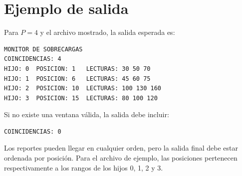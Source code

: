 \documentclass[12pt,a4paper]{article}
\begin{document}
\section*{Ejemplo de salida}
Para $P=4$ y el archivo mostrado, la salida esperada es:

\begin{lstlisting}[language={}, numbers=none]
MONITOR DE SOBRECARGAS
COINCIDENCIAS: 4
HIJO: 0  POSICION: 1   LECTURAS: 30 50 70
HIJO: 1  POSICION: 6   LECTURAS: 45 60 75
HIJO: 2  POSICION: 10  LECTURAS: 100 130 160
HIJO: 3  POSICION: 15  LECTURAS: 80 100 120
\end{lstlisting}

Si no existe una ventana válida, la salida debe incluir:

\begin{lstlisting}[language={}, numbers=none]
COINCIDENCIAS: 0
\end{lstlisting}

Los reportes pueden llegar en cualquier orden, pero la salida final debe estar ordenada por posición. Para el archivo de ejemplo, las posiciones pertenecen respectivamente a los rangos de los hijos 0, 1, 2 y 3.
\end{document}

